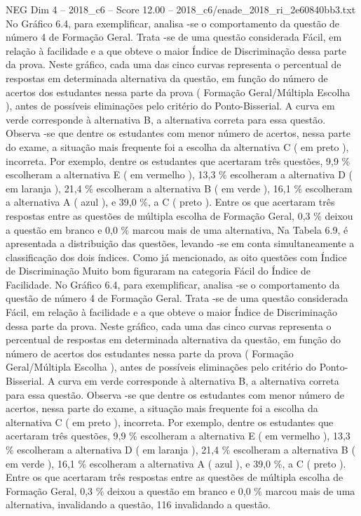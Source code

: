 \begin{textsample}{NEG Dim 4 – 2018\_c6 – Score 12.00 – 2018\_c6/enade\_2018\_ri\_2e60840bb3.txt}
No Gráfico 6.4, para exemplificar, analisa -se o comportamento da questão de número 4 de Formação Geral.
Trata -se de uma questão considerada Fácil, em relação à facilidade e a que obteve o maior Índice de Discriminação dessa parte da prova.
Neste gráfico, cada uma das cinco curvas representa o percentual de respostas em determinada alternativa da questão, em função do número de acertos dos estudantes nessa parte da prova ( Formação Geral/Múltipla Escolha ), antes de possíveis eliminações pelo critério do Ponto-Bisserial.
A curva em verde corresponde à alternativa B, a alternativa correta para essa questão.
Observa -se que dentre os estudantes com menor número de acertos, nessa parte do exame, a situação mais frequente foi a escolha da alternativa C ( em preto ), incorreta.
Por exemplo, dentre os estudantes que acertaram três questões, 9,9 \% escolheram a alternativa E ( em vermelho ), 13,3 \% escolheram a alternativa D ( em laranja ), 21,4 \% escolheram a alternativa B ( em verde ), 16,1 \% escolheram a alternativa A ( azul ), e 39,0 \%, a C ( preto ).
Entre os que acertaram três respostas entre as questões de múltipla escolha de Formação Geral, 0,3 \% deixou a questão em branco e 0,0 \% marcou mais de uma alternativa, Na Tabela 6.9, é apresentada a distribuição das questões, levando -se em conta simultaneamente a classificação dos dois índices.
Como já mencionado, as oito questões com Índice de Discriminação Muito bom figuraram na categoria Fácil do Índice de Facilidade.
No Gráfico 6.4, para exemplificar, analisa -se o comportamento da questão de número 4 de Formação Geral.
Trata -se de uma questão considerada Fácil, em relação à facilidade e a que obteve o maior Índice de Discriminação dessa parte da prova.
Neste gráfico, cada uma das cinco curvas representa o percentual de respostas em determinada alternativa da questão, em função do número de acertos dos estudantes nessa parte da prova ( Formação Geral/Múltipla Escolha ), antes de possíveis eliminações pelo critério do Ponto-Bisserial.
A curva em verde corresponde à alternativa B, a alternativa correta para essa questão.
Observa -se que dentre os estudantes com menor número de acertos, nessa parte do exame, a situação mais frequente foi a escolha da alternativa C ( em preto ), incorreta.
Por exemplo, dentre os estudantes que acertaram três questões, 9,9 \% escolheram a alternativa E ( em vermelho ), 13,3 \% escolheram a alternativa D ( em laranja ), 21,4 \% escolheram a alternativa B ( em verde ), 16,1 \% escolheram a alternativa A ( azul ), e 39,0 \%, a C ( preto ).
Entre os que acertaram três respostas entre as questões de múltipla escolha de Formação Geral, 0,3 \% deixou a questão em branco e 0,0 \% marcou mais de uma alternativa, invalidando a questão, 116 invalidando a questão.

\end{textsample}
